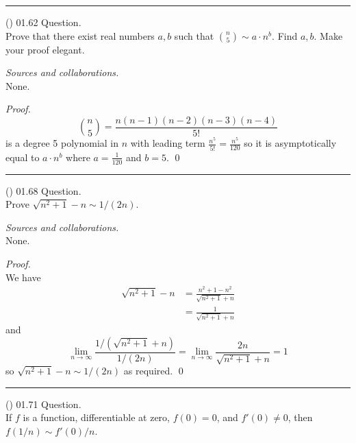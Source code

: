 \documentclass{amsart}
\begin{document}
\bigskip\hrule

\vspace{0.5cm}

\newpage
\Large
{}

\noindent
(\done) 01.62 Question. \\
Prove that there exist real numbers $a, b$ such that $\binom{n}{5} \sim a \cdot n^b$. Find $a, b$. Make your proof elegant.

\medskip\noindent
\emph{Sources and collaborations.}\\
None.

\medskip\noindent
\emph{Proof.}\\
\begin{equation*}
    \binom{n}{5} = \frac{n(n-1)(n-2)(n-3)(n-4)}{5!}
\end{equation*}
is a degree 5 polynomial in $n$ with leading term $\frac{n^5}{5!} = \frac{n^5}{120}$ so it is asymptotically equal to $a \cdot n^b$ where $a = \frac{1}{120}$ and $b = 5$.
\qed

\bigskip\hrule

\vspace{0.5cm}


\newpage
\Large
{}

\noindent
(\done) 01.68 Question. \\
Prove $\sqrt{n^2 + 1} -n \sim 1/(2n)$.

\medskip\noindent
\emph{Sources and collaborations.}\\
None.

\medskip\noindent
\emph{Proof.}\\
We have 
\begin{align*}
    \sqrt{n^2 + 1} - n &= \frac{n^2 + 1 - n^2}{\sqrt{n^2 + 1} + n} \\
    &= \frac{1}{\sqrt{n^2 + 1} + n}
\end{align*}
and
\begin{equation*}
\lim_{n \to \infty} \frac{1/(\sqrt{n^2 + 1} + n)}{1/(2n)} = \lim_{n \to \infty} \frac{2n}{\sqrt{n^2 + 1} + n} = 1
\end{equation*}
so $\sqrt{n^2 + 1} - n \sim 1/(2n)$ as required.
\qed

\bigskip\hrule

\vspace{0.5cm}

\newpage
\Large
{}
\noindent
(\done) 01.71 Question. \\
If $f$ is a function, differentiable at zero, $f(0) = 0$, and $f'(0) \neq 0$, then $f(1/n) \sim f'(0)/n$.
\end{document}
